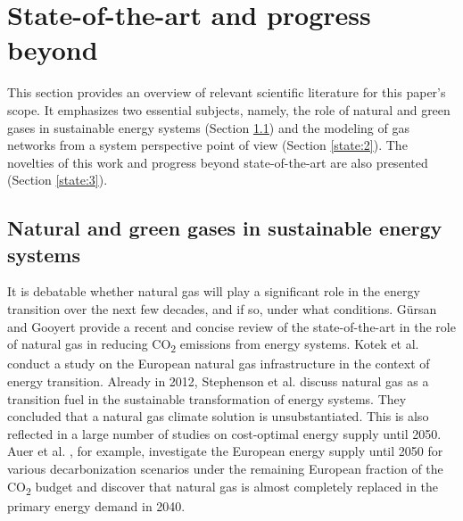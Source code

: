 \section{State-of-the-art and progress beyond}\label{stateoftheart}
This section provides an overview of relevant scientific literature for this paper's scope. It emphasizes two essential subjects, namely, the role of natural and green gases in sustainable energy systems (Section \ref{state:1}) and the modeling of gas networks from a system perspective point of view (Section \ref{state:2}). The novelties of this work and progress beyond state-of-the-art are also presented (Section \ref{state:3}). 

\subsection{Natural and green gases in sustainable energy systems}\label{state:1}
It is debatable whether natural gas will play a significant role in the energy transition over the next few decades, and if so, under what conditions. Gürsan and Gooyert \cite{gursan2021systemic} provide a recent and concise review of the state-of-the-art in the role of natural gas in reducing CO\textsubscript{2} emissions from energy systems. Kotek et al. \cite{kotek2019european} conduct a study on the European natural gas infrastructure in the context of energy transition. Already in 2012, Stephenson et al. \cite{stephenson2012greenwashing} discuss natural gas as a transition fuel in the sustainable transformation of energy systems. They concluded that a natural gas climate solution is unsubstantiated. This is also reflected in a large number of studies on cost-optimal energy supply until 2050. Auer et al. \cite{auer2020development}, for example, investigate the European energy supply until 2050 for various decarbonization scenarios under the remaining European fraction of the CO\textsubscript{2} budget and discover that natural gas is almost completely replaced in the primary energy demand in 2040.\vspace{0.35cm}

